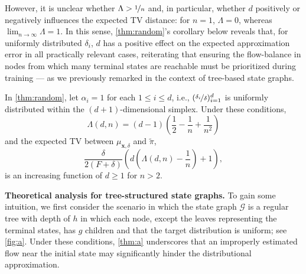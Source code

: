 However, it is unclear whether $\Lambda > \nicefrac{1}{n}$ and, in particular, whether $d$ positively or negatively influences the expected TV distance: for $n = 1$, $\Lambda = 0$, whereas $\lim_{n \rightarrow \infty} \Lambda = 1$. In this sense, \autoref{thm:random}'s corollary below reveals that, for uniformly distributed $\delta_{i}$, $d$ has a positive effect on the expected approximation error in all practically relevant cases, reiterating that ensuring the flow-balance in nodes from which many terminal states are reachable must be prioritized during training --- as we previously remarked in the context of tree-based state graphs. 

\begin{corollary} \label{col:random} 
    In \autoref{thm:random}, let $\alpha_{i} = 1$ for each $1 \le i \le d$, i.e., $(\nicefrac{\delta_{i}}{\delta})_{i=1}^{d}$ is uniformly distributed within the $(d + 1)$-dimensional simplex. Under these conditions, 
    \begin{equation*}
        \Lambda(d, n) = (d - 1) \left( \frac{1}{2} - \frac{1}{n} + \frac{1}{n^{2}}\right)  
    \end{equation*}
    and the expected TV between $\mu_{\mathbf{x}, \delta}$  and $\tilde{\pi}$, 
    \begin{equation*}
        \frac{\delta}{2(F + \delta)} \left( d \left( \Lambda(d, n) - \frac{1}{n} \right) + 1 \right),   
    \end{equation*}
    is an increasing function of $d \ge 1$ for $n > 2$. 
\end{corollary}



\vspace{4pt}\noindent\textbf{Theoretical analysis for tree-structured state graphs.} To gain some intuition, we first consider the scenario in which the state graph $\mathcal{G}$ is a regular tree with depth of $h$ in which each node, except the leaves representing the terminal states, has $g$ children and that the target distribution is uniform; see \autoref{fig:a}. Under these conditions, \autoref{thm:a} underscores that an improperly estimated flow near the initial state may significantly hinder the distributional approximation. 

